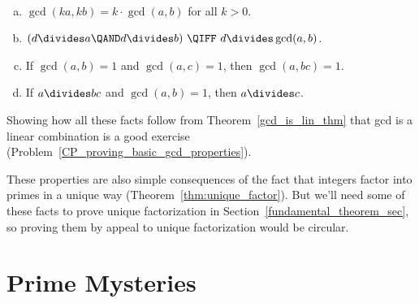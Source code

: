 \begin{lemma}\label{lem:gcd-hold} \mbox{  }

\begin{enumerate}[a)]
\item\label{gcd2} $\gcd(k a, k b) = k \cdot \gcd(a, b)$ for all $k > 0$.
\item\label{gcd1} $(d \divides a \QAND d \divides b)\ \QIFF\ d \divides \gcd(a, b)$.
\item\label{gcd3} If $\gcd(a, b) = 1$ and $\gcd(a, c) = 1$, then $\gcd(a, bc) = 1$.
\item\label{gcd4} If $a \divides b c$ and $\gcd(a, b) = 1$, then $a \divides c$.
\end{enumerate}
\end{lemma}

Showing how all these facts follow from Theorem~\ref{gcd_is_lin_thm}
that gcd is a linear combination is a good exercise
(Problem~\ref{CP_proving_basic_gcd_properties}).

These properties are also simple consequences of the fact that
integers factor into primes in a unique way
(Theorem~\ref{thm:unique_factor}).  But we'll need some of these facts
to prove unique factorization in
Section~\ref{fundamental_theorem_sec}, so proving them by appeal to
unique factorization would be circular.

\begin{problems}

\practiceproblems
{}

\classproblems
{}

\homeworkproblems
{}

\examproblems
{}
\end{problems}

\section{Prime Mysteries}

